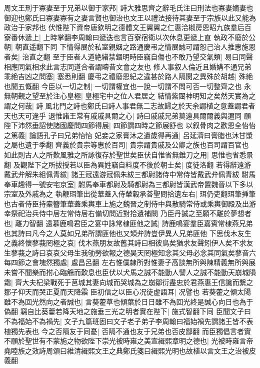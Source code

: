 周文王刑于寡妻至于兄弟以御于家邦|{
	詩大雅思齊之辭毛氏注曰刑法也寡妻嫡妻也御迎也鄭氏曰寡妻寡有之妻言賢也御治也文王以禮法接待其妻至于宗族以此又能為政治于家邦也}
伏惟陛下資帝唐欽明之德體文王翼翼之仁惠洽椒房恩昭九族羣后百寮番休遞上|{
	上時掌翻李周翰曰遞迭也言百寮宿衛以次休息更遞上直}
執政不廢於公朝|{
	朝直遥翻下同}
下情得展於私室親姻之路通慶弔之情展誠可謂恕己治人推惠施恩者矣|{
	治直之翻}
至于臣者人道絶緒禁錮明時臣竊自傷也不敢乃望交氣類|{
	易曰同聲相應同氣相求此言志同道合者謂疇昔文會之友也}
修人事叙人倫近且婚媾不通兄弟乖絶吉凶之問塞|{
	塞悉則翻}
慶弔之禮廢恩紀之違甚於路人隔閡之異殊於胡越|{
	殊絶也閡五慨翻}
今臣以一切之制|{
	一切謂權宜也一說一切謂不問可否一切整齊之也}
永無朝覲之望至於注心皇極|{
	皇極宅中之位人君居之}
結情紫闥神明知之矣然天實為之謂之何哉|{
	詩風北門之詩也鄭氏曰詩人事君無二志故歸之於天余謂植之意蓋謂君者天也天可違乎}
退惟諸王常有戚戚具爾之心|{
	詩曰戚戚兄弟莫遠具爾爾義與邇同}
願陛下沛然垂詔使諸國慶問四節得展|{
	四節謂四時之節展舒也}
以叙骨肉之歡恩全怡怡之篤義|{
	論語孔子曰兄弟怡怡}
妃妾之家膏沐之遺歲得再通|{
	呂延濟曰膏脂也沐甘漿之屬也遺于季翻}
齊義於貴宗等惠於百司|{
	貴宗謂貴戚及公卿之族也百司謂百官也}
如此則古人之所歎風雅之所詠復存於聖世矣臣伏自惟省無錐刀之用|{
	思惟也省悉景翻}
及觀陛下之所拔授若以臣為異姓竊自料度不後於朝士矣|{
	度徒洛翻}
若得辭遠游戴武弁解朱組佩青紱|{
	諸王冠遠游冠佩朱紱三都尉諸侍中常侍皆戴武弁佩青紱}
駙馬奉車趣得一號安宅京室|{
	駙馬奉車都尉及騎都尉為三都尉皆漢武帝置魏晉以下多以宗室及外戚為之}
執鞭珥筆出從華蓋入侍輦轂承荅聖問拾遺左右|{
	珥仍吏翻珥筆挿筆也古者侍臣持槖簪筆華蓋乘輿車上施之魏晉之制侍中與散騎常侍或乘輿御殿及出游幸祭祀治兵侍中居左常侍居右備切問近對拾遺補闕}
乃臣丹誠之至願不離於夢想者也|{
	離力智翻}
遠慕鹿鳴君臣之宴中詠常棣匪他之誡|{
	詩鹿鳴宴羣臣嘉賓常棣燕兄弟也其詩曰凡今之人莫如兄弟所謂匪他也又頍弁詩豈伊異人兄弟匪他}
下思伐木友生之義終懷蓼莪罔極之哀|{
	伐木燕朋友故舊其詩曰相彼鳥矣猶求友聲矧伊人矣不求友生蓼莪之詩曰哀哀父母生我劬勞欲報之德昊天罔極知念其父母必念其同氣矣蓼音六}
每四節之會塊然獨處|{
	處昌呂翻}
左右惟僕隸所對惟妻子高談無所與陳精義無所與展未嘗不聞樂而拊心臨觴而歎息也臣伏以犬馬之誠不能動人譬人之誠不能動天崩城隕霜|{
	齊大夫杞梁戰死于莒城其妻向城而哭城為之崩鄒衍盡忠於君燕惠王信讒而繫之鄒子仰天而哭正夏而天降霜}
臣初信之以臣心况徒虚語耳|{
	况譬也}
若葵藿之傾太陽雖不為回光然向之者誠也|{
	言葵藿草也傾葉於日日雖不為回光終是誠心向日也為于偽翻}
竊自比葵藿若降天地之施垂三光之明者實在陛下|{
	施式智翻下同}
臣聞文子曰不為福始不為禍先|{
	文子九篇班固曰文子老子弟子李周翰曰福始禍先謂諸王皆不表植獨先表也}
今之否隔友于同憂|{
	否隔不通也友于兄弟也否皮鄙翻}
而臣獨倡言者實不願於聖世有不蒙施之物欲陛下崇光被時雍之美宣緝熙章明之德也|{
	光被時雍言帝堯睦族之效詩周頌曰維清緝熙文王之典鄭氏箋曰緝熙光明也故植以言文王之治被皮義翻}

